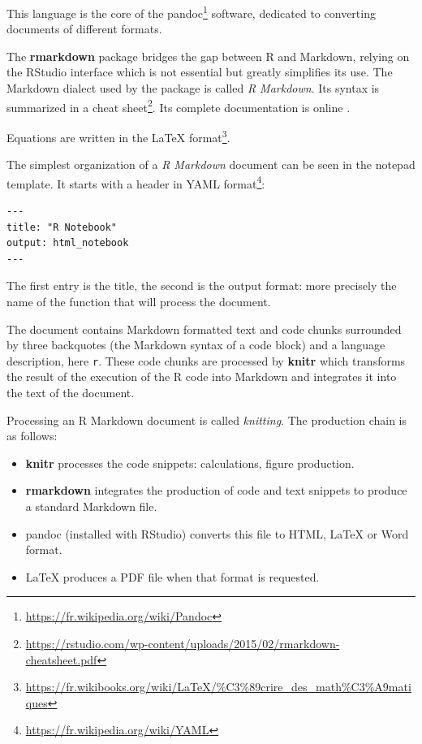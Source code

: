 \documentclass[
  12pt,
  american,
  a4paper,
  extrafontsizes,onecolumn,openright
  ]{memoir}
\providecommand{\tightlist}{%
  \setlength{\itemsep}{0pt}\setlength{\parskip}{0pt}}
\newlength{\rf}
\begin{document}
This language is the core of the pandoc\footnote{\url{https://fr.wikipedia.org/wiki/Pandoc}} software, dedicated to converting documents of different formats.

The \textbf{rmarkdown} package \autocite{Xie2015} bridges the gap between R and Markdown, relying on the RStudio interface which is not essential but greatly simplifies its use.
The Markdown dialect used by the package is called \emph{R Markdown}.
Its syntax is summarized in a cheat sheet\footnote{\url{https://rstudio.com/wp-content/uploads/2015/02/rmarkdown-cheatsheet.pdf}}.
Its complete documentation is online \autocite{Xie2018}.

Equations are written in the LaTeX format\footnote{\url{https://fr.wikibooks.org/wiki/LaTeX/\%C3\%89crire_des_math\%C3\%A9matiques}}.

The simplest organization of a \emph{R Markdown} document can be seen in the notepad template.
It starts with a header in YAML format\footnote{\url{https://fr.wikipedia.org/wiki/YAML}}:

\begin{verbatim}
---
title: "R Notebook"
output: html_notebook
---
\end{verbatim}

The first entry is the title, the second is the output format: more precisely the name of the function that will process the document.

The document contains Markdown formatted text and code chunks surrounded by three backquotes (the Markdown syntax of a code block) and a language description, here \texttt{r}.
These code chunks are processed by \textbf{knitr} which transforms the result of the execution of the R code into Markdown and integrates it into the text of the document.

Processing an R Markdown document is called \emph{knitting}.
The production chain is as follows:

\begin{itemize}
\tightlist
\item
  \textbf{knitr} processes the code snippets: calculations, figure production.
\item
  \textbf{rmarkdown} integrates the production of code and text snippets to produce a standard Markdown file.
\item
  pandoc (installed with RStudio) converts this file to HTML, LaTeX or Word format.
\item
  LaTeX produces a PDF file when that format is requested.
\end{itemize}
\end{document}
